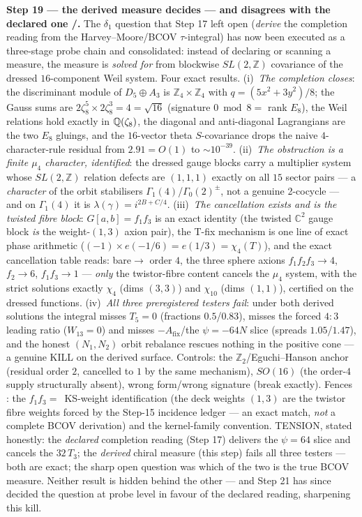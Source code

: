 \documentclass[11pt,a4paper]{article}
\newcommand{\Z}{\mathbb{Z}}
\theoremstyle{definition}
\begin{document}
\par\smallskip\noindent\textbf{Step 19 --- the derived measure decides --- and disagrees with the
declared one \mE/\mC.} The $\delta_1$ question that Step 17 left open (\emph{derive} the
completion reading from the Harvey--Moore/BCOV $\tau$-integral) has now been executed as a
three-stage probe chain and consolidated: instead of declaring or scanning a measure, the
measure is \emph{solved for} from blockwise $SL(2,\Z)$ covariance of the dressed
$16$-component Weil system. Four exact results. (i)~\emph{The completion closes}: the
discriminant module of $D_5{\oplus}A_3$ is $\Z_4{\times}\Z_4$ with $q=(5x^2{+}3y^2)/8$; the
Gauss sums are $2\zeta_8^5\times2\zeta_8^3=4=\sqrt{16}$ (signature $0\bmod8=$ rank $E_8$), the
Weil relations hold exactly in $\mathbb{Q}(\zeta_8)$, the diagonal and anti-diagonal Lagrangians are
the two $E_8$ gluings, and the $16$-vector theta $S$-covariance drops the naive
$4$-character-rule residual from $2.91=O(1)$ to $\sim10^{-39}$. (ii)~\emph{The obstruction is
a finite $\mu_4$ character, identified}: the dressed gauge blocks carry a multiplier system
whose $SL(2,\Z)$ relation defects are $(1,1,1)$ exactly on all $15$ sector pairs --- a
\emph{character} of the orbit stabilisers $\Gamma_1(4)$/$\Gamma_0(2)^\pm$, not a genuine
2-cocycle --- and on $\Gamma_1(4)$ it is $\lambda(\gamma)=i^{2B+C/4}$. (iii)~\emph{The
cancellation exists and is the twisted fibre block}: $G[a,b]=f_1f_3$ is an exact identity (the
twisted $\mathbb C^2$ gauge block \emph{is} the weight-$(1,3)$ axion pair), the T-fix
mechanism is one line of exact phase arithmetic ($(-1)\times e(-1/6)=e(1/3)=\chi_4(T)$), and
the exact cancellation table reads: bare${}\to$ order $4$, the three sphere axions
$f_1f_2f_3\to4$, $f_2\to6$, $f_1f_3\to1$ --- \emph{only} the twistor-fibre content cancels the
$\mu_4$ system, with the strict solutions exactly $\chi_4$ (dims $(3,3)$) and $\chi_{10}$
(dims $(1,1)$), certified on the dressed functions. (iv)~\emph{All three preregistered testers
fail}: under both derived solutions the integral misses $T_5=0$ (fractions $0.5$/$0.83$),
misses the forced $4{:}3$ leading ratio ($W_{13}=0$) and misses $-A_{\mathrm{fix}}$/the
$\psi=-64N$ slice (spreads $1.05$/$1.47$), and the honest $(N_1,N_2)$ orbit rebalance rescues
nothing in the positive cone --- a genuine KILL on the derived surface. Controls: the
$\Z_2$/Eguchi--Hanson anchor (residual order $2$, cancelled to $1$ by the same mechanism),
$SO(16)$ (the order-$4$ supply structurally absent), wrong form/wrong signature (break
exactly). Fences \mC: the $f_1f_3=$~KS-weight identification (the deck weights $(1,3)$ are the
twistor fibre weights forced by the Step-15 incidence ledger --- an exact match, \emph{not} a
complete BCOV derivation) and the kernel-family convention. TENSION, stated honestly: the
\emph{declared} completion reading (Step 17) delivers the $\psi=64$ slice and cancels the
$32\,T_3$; the \emph{derived} chiral measure (this step) fails all three testers --- both are
exact; the sharp open question was which of the two is the true BCOV measure. Neither result is
hidden behind the other --- and Step 21 has since decided the question at probe level in favour
of the declared reading, sharpening this kill.
\end{document}
